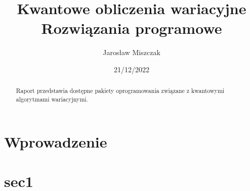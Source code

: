 \documentclass[a4paper,11pt]{article}
\begin{document}
\title{Kwantowe obliczenia wariacyjne\\ {\normalsize Rozwiązania programowe}}

\author{Jarosław Miszczak}
\date{21/12/2022}

\maketitle

\begin{abstract}
Raport przedstawia dostępne pakiety oprogramowania związane z kwantowymi algorytmami wariacyjnymi. 
\end{abstract}


\hypertarget{wprowadzenie}{%
\section{Wprowadzenie}\label{wprowadzenie}}


\newpage 

\hypertarget{sec1}{%
	\section{sec1}\label{sec1}}




\paragraph{}
\paragraph{}
\paragraph{}
\paragraph{}





\subsection{}
\end{document}
